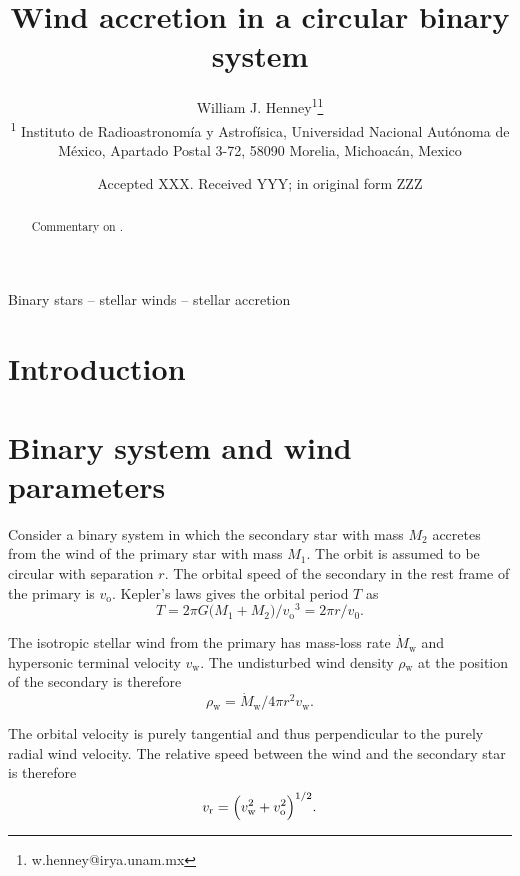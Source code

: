 \documentclass[useAMS, usenatbib, a4paper]{mnras}
\title[Wind accretion in a circular binary system]
{
  Wind accretion in a circular binary system  
}
\author[Henney et al.]{
  William J. Henney\textsuperscript{1}\thanks{w.henney@irya.unam.mx}
  \\
  \textsuperscript{1}\foreignlanguage{spanish}{%
    Instituto de Radioastronomía y
    Astrofísica, Universidad Nacional Autónoma de México, Apartado
    Postal 3-72, 58090 Morelia, Michoacán, Mexico}\\
}
\date{Accepted XXX. Received YYY; in original form ZZZ}
\newcommand\wind{\ensuremath{_{\mathrm{w}}}}
\newcommand\mdwind{\ensuremath{\dot M\wind}}
\newcommand\orb{\ensuremath{_{\mathrm{o}}}}
\newcommand\rel{\ensuremath{_{\mathrm{r}}}}
\begin{document}
\label{firstpage}
\pagerange{\pageref{firstpage}--\pageref{lastpage}}
\maketitle



\begin{abstract}
  Commentary on \citet{Tejeda:2025a}.
\end{abstract}

\begin{keywords}
Binary stars -- stellar winds -- stellar accretion
\end{keywords}

\section{Introduction}
\label{sec:introduction}

\section{Binary system and wind parameters}
\label{sec:binary-syst-param}

Consider a binary system in which the secondary star with mass \(M_2\) accretes from the wind of the primary star with mass \(M_1\).
The orbit is assumed to be circular with separation \(r\).
The orbital speed of the secondary in the rest frame of the primary is \(v\orb\).
Kepler's laws gives the orbital period \(T\) as
\begin{equation}
  \label{eq:period}
  T = 2\pi G \bigl(M_1 + M_2\bigr) / v\orb^3 = 2\pi r / v_0. 
\end{equation}

The isotropic stellar wind from the primary has mass-loss rate \(\dot M\wind\) and hypersonic terminal velocity \(v\wind\).
The undisturbed wind density \(\rho\wind\) at the position of the secondary is therefore
\begin{equation}
  \label{eq:rho-wind}
  \rho\wind = \mdwind / 4\pi r^2 v\wind. 
\end{equation}

The orbital velocity is purely tangential and thus perpendicular to the purely radial wind velocity. The relative speed between the wind and the secondary star is therefore
\begin{equation}
  \label{eq:relative-velocity}
  v\rel = \Bigl(v\wind^2 + v\orb^2\Bigr)^{1/2}.
\end{equation}
\end{document}
